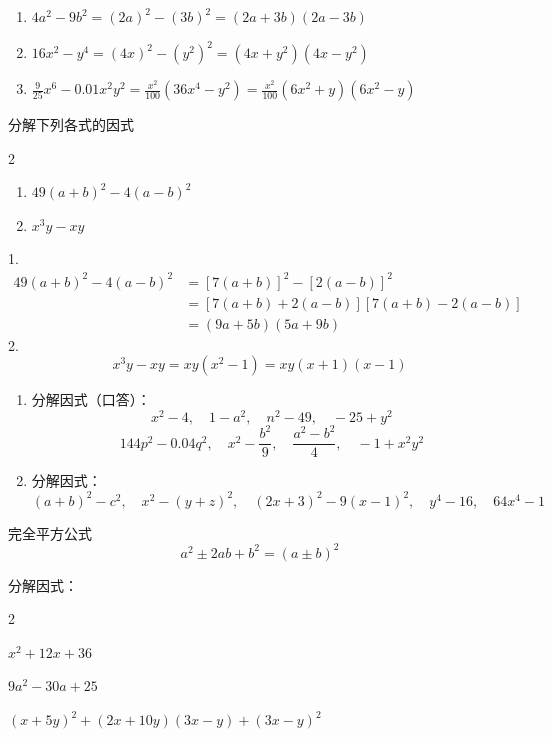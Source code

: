 \begin{solution}
\begin{enumerate}
         \item $4a^2-9b^2=(2a)^2-(3b)^2=(2a+3b)(2a-3b)$
         \item $16x^2-y^4=(4x)^2-(y^2)^2=(4x+y^2)(4x-y^2)$
         \item $\frac{9}{25}x^6-0.01 x^2y^2=\frac{x^2}{100}(36x^4-y^2)=\frac{x^2}{100}(6x^2+y)(6x^2-y)$
\end{enumerate}    
\end{solution}

\begin{example}
分解下列各式的因式
\begin{multicols}{2}
    \begin{enumerate}
        \item $49(a+b)^2-4(a-b)^2$
        \item $x^3y-xy$
    \end{enumerate}
\end{multicols}
\end{example}

\begin{solution}
1.\[\begin{split}
    49(a+b)^2-4(a-b)^2&=[7(a+b)]^2-[2(a-b)]^2\\
    &=[7(a+b)+2(a-b)][7(a+b)-2(a-b)]\\
    &=(9a+5b)(5a+9b)
\end{split}\]
2.\[x^3y-xy=xy(x^2-1)=xy(x+1)(x-1)\]    
\end{solution}

\begin{ex}
\begin{enumerate}
    \item 分解因式（口答）：
    \[x^2-4,\quad 1-a^2,\quad n^2-49,\quad -25+y^2 \]
    \[144p^2-0.04q^2,\quad x^2-\frac{b^2}{9},\quad \frac{a^2-b^2}{4},\quad -1+x^2y^2\]
    \item 分解因式：
    \[(a+b)^2-c^2,\quad x^2-(y+z)^2,\quad (2x+3)^2-9(x-1)^2,\quad y^4-16,\quad 64x^4-1 \]
\end{enumerate}
\end{ex}

\begin{blk}{完全平方公式}
    \[a^2\pm 2ab+b^2=(a\pm b)^2\]
\end{blk}

\begin{example}
分解因式：
\begin{enumerate}
    \begin{multicols}{2}
    \item $x^2+12x+36$
    \item $9a^2-30a+25$
    \item $(x+5y)^2+(2x+10y)(3x-y)+(3x-y)^2$
    \end{multicols}
\end{enumerate}
\end{example}

